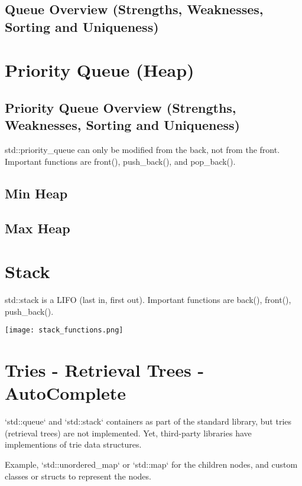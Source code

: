 \documentclass[openany]{report}
\begin{document}
\subsection{Queue Overview (Strengths, Weaknesses, Sorting and Uniqueness)}

\section{Priority Queue (Heap)}
\subsection{Priority Queue Overview (Strengths, Weaknesses, Sorting and Uniqueness)}

std::priority\_queue can only be modified from the back, not from the front. Important functions are front(), push\_back(), 
and pop\_back().

\subsection{Min Heap}
\subsection{Max Heap}

\section{Stack}

std::stack is a LIFO (last in, first out). Important functions are back(), front(), push\_back().

\begin{center}
    \texttt{[image: stack\_functions.png]}
\end{center}

\section{Tries - Retrieval Trees - AutoComplete}

`std::queue` and `std::stack` containers as part of the standard library,
but tries (retrieval trees) are not implemented. 
Yet, third-party libraries have implementions of trie data structures.

Example, `std::unordered\_map` or `std::map` for the children nodes,
and custom classes or structs to represent the nodes.
\end{document}
